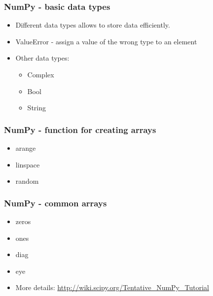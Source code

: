 \documentclass[11pt]{beamer}
\begin{document}
%
\begin{frame}[plain]
    \frametitle{NumPy - basic data types}
    \begin{itemize}
        \item[] Different data types allows to store data efficiently.
        \newline
        \pause
         
         \pause
         \item[] ValueError - assign a value of the wrong type to an element
         
         \pause
         \item[] Other data types: 
        \begin{itemize}
            \item[] Complex 
            \item[] Bool 
            \item[] String
        \end{itemize}
         \pause
        
    \end{itemize}
\end{frame}
%
\begin{frame}[plain]
    \frametitle{NumPy - function for creating arrays}
    \begin{itemize}
        \item[] arange
        
        \pause
        \item[] linspace
        
        \pause
        \item[] random
        
        \pause
        
    \end{itemize}
\end{frame}
%
\begin{frame}[plain]
    \frametitle{NumPy - common arrays}
    \begin{itemize}
        \item[] zeros  
        
        \pause
        \item[] ones 
        
        \pause
        \item[] diag  
        
        \pause
        \item[] eye   
        
        \pause
        \item[] More details: \url{http://wiki.scipy.org/Tentative_NumPy_Tutorial}
    \end{itemize}
\end{frame}
\end{document}
